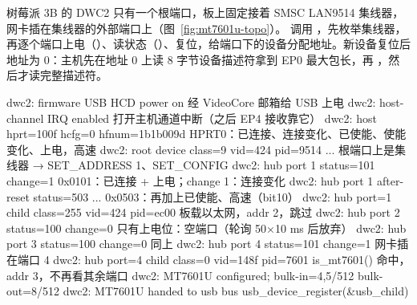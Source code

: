 树莓派 3B 的 DWC2 只有一个根端口，板上固定接着 SMSC LAN9514 集线器，网卡插在集线器的外部端口上（图~\ref{fig:mt7601u-topo}）。 调用 ，先枚举集线器，再逐个端口上电（）、读状态（）、复位，给端口下的设备分配地址。新设备复位后地址为 0：主机先在地址 0 上读 8 字节设备描述符拿到 EP0 最大包长，再 ，然后才读完整描述符。

\begin{txtcode}
dwc2: firmware USB HCD power on                 经 VideoCore 邮箱给 USB 上电
dwc2: host-channel IRQ enabled                  打开主机通道中断（之后 EP4 接收靠它）
dwc2: host hprt=100f hcfg=0 hfnum=1b1b009d      HPRT0：已连接、连接变化、已使能、使能变化、上电，高速
dwc2: root device class=9 vid=424 pid=9514 ...  根端口上是集线器 → SET_ADDRESS 1、SET_CONFIG
dwc2: hub port 1 status=101 change=1            0x0101：已连接 + 上电；change 1：连接变化
dwc2: hub port 1 after-reset status=503 ...     0x0503：再加上已使能、高速（bit10）
dwc2: hub port=1 child class=255 vid=424 pid=ec00   板载以太网，addr 2，跳过
dwc2: hub port 2 status=100 change=0            只有上电位：空端口（轮询 50×10 ms 后放弃）
dwc2: hub port 3 status=100 change=0            同上
dwc2: hub port 4 status=101 change=1            网卡插在端口 4
dwc2: hub port=4 child class=0 vid=148f pid=7601    is_mt7601() 命中，addr 3，不再看其余端口
dwc2: MT7601U configured; bulk-in=4,5/512 bulk-out=8/512
dwc2: MT7601U handed to usb bus                 usb_device_register(&usb_child)
\end{txtcode}


